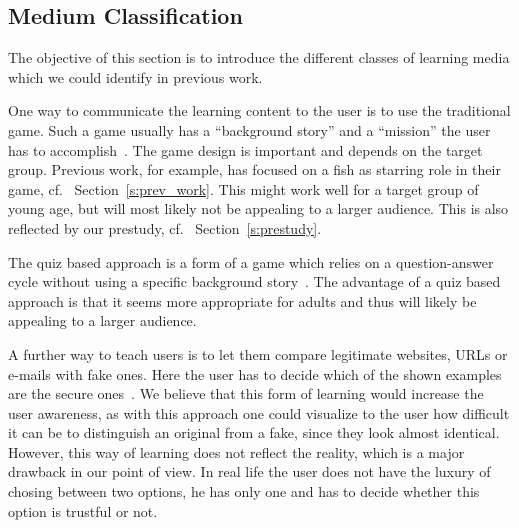 \begin{description}[leftmargin=0cm]
\end{description}



\subsection{Medium Classification}
The objective of this section is to introduce the different classes of learning media which we could identify in previous work.


\begin{description}[leftmargin=0cm]
	\item[Game Based Learning] One way to communicate the learning content to the user is to use the traditional game.
 Such a game usually has a ``background story'' and a ``mission'' the user has to accomplish~\cite{sheng2007antiphishingphil,antiphishingphyllis}. The game design is important and depends on the target group.
 Previous work, for example, has focused on a fish as starring role in their game, cf.
~Section~\ref{s:prev_work}. This might work well for a target group of young age, but will most likely not be appealing to a larger audience.
 This is also reflected by our prestudy, cf.
~Section~\ref{s:prestudy}.
	\item[Quiz Based Learning] The quiz based approach is a form of a game which relies on a question-answer cycle without using a specific background story~\cite{onguardonline}. The advantage of a quiz based approach is that it seems more appropriate for adults and thus will likely be appealing to a larger audience.

	\item[Comparison Based Learning] A further way to teach users is to let them compare legitimate websites, URLs or e-mails with fake ones.
 Here the user has to decide which of the shown examples are the secure ones~\cite{staysafeonline}. We believe that this form of learning would increase the user awareness, as with this approach one could visualize to the user how difficult it can be to distinguish an original from a fake, since they look almost identical.
 However, this way of learning does not reflect the reality, which is a major drawback in our point of view.
 In real life the user does not have the luxury of chosing between two options, he has only one and has to decide whether this option is trustful or not.


\end{description}
